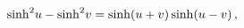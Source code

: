 \[{\mathop{\sinh\/}\nolimits^{2}}u-{\mathop{\sinh\/}\nolimits^{2}}v=\mathop{%
\sinh\/}\nolimits\!\left(u+v\right)\mathop{\sinh\/}\nolimits\!\left(u-v\right),\]